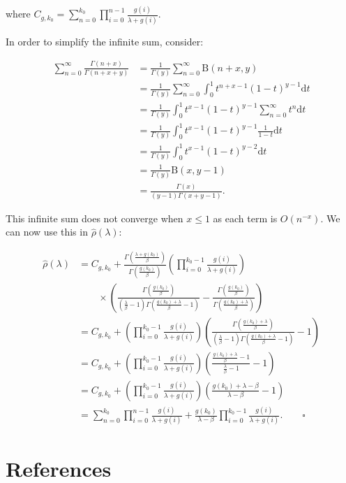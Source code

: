 \documentclass[
  sn-basic,
  10pt,
]{sn-jnl}
\theoremstyle{thmstyleone}
\theoremstyle{thmstyleone}
\theoremstyle{remark}
\theoremstyle{plain}
\theoremstyle{plain}
\theoremstyle{remark}
\begin{document}
where
\(C_{g,k_0} = \sum_{n=0}^{k_0}\prod_{i=0}^{n-1}\frac{g(i)}{\lambda+g(i)}\).

In order to simplify the infinite sum, consider:

\begin{align*}
\sum_{n=0}^\infty\frac{\Gamma(n+x)}{\Gamma(n+x+y)} &=\frac{1}{\Gamma(y)}\sum_{n=0}^\infty \text{B}(n+x,y)\\
&=\frac{1}{\Gamma(y)}\sum_{n=0}^\infty\int_0^1t^{n+x-1}(1-t)^{y-1}\text{d}t\\
&=\frac{1}{\Gamma(y)}\int_0^1 t^{x-1}(1-t)^{y-1}\sum_{n=0}^\infty t^n \text{d}t\\
&=\frac{1}{\Gamma(y)}\int_0^1 t^{x-1}(1-t)^{y-1}\frac{1}{1-t}\text{d}t\\
&=\frac{1}{\Gamma(y)}\int_0^1 t^{x-1}(1-t)^{y-2}\text{d}t\\
&=\frac{1}{\Gamma(y)}\text{B}(x,y-1)\\
&= \frac{\Gamma(x)}{(y-1)\Gamma(x+y-1)}.
\end{align*}

This infinite sum does not converge when \(x\le1\) as each term is
\(O(n^{-x})\). We can now use this in \(\hat\rho(\lambda)\):

\begin{align*}
\hat\rho(\lambda) &= C_{g,k_0} + \frac{\Gamma\left(\frac{\lambda+g(k_0)}{\beta}\right)}{\Gamma\left(\frac{g(k_0)}{\beta}\right)}\left(\prod_{i=0}^{k_0-1}\frac{g(i)}{\lambda+g(i)}\right)\\&\qquad \times\left(\frac{\Gamma\left(\frac{g(k_0)}{\beta}\right)}{\left(\frac{\lambda}{\beta}-1\right)\Gamma\left(\frac{g(k_0)+\lambda}{\beta}-1\right)}-\frac{\Gamma\left(\frac{g(k_0)}{\beta}\right)}{\Gamma\left(\frac{g(k_0)+\lambda}{\beta}\right)}\right)\\
&=C_{g,k_0} + \left(\prod_{i=0}^{k_0-1}\frac{g(i)}{\lambda+g(i)}\right)\left(\frac{\Gamma\left(\frac{g(k_0)+\lambda}{\beta}\right)}{\left(\frac{\lambda}{\beta}-1\right)\Gamma\left(\frac{g(k_0)+\lambda}{\beta}-1\right)}-1\right)\\
&=C_{g,k_0} + \left(\prod_{i=0}^{k_0-1}\frac{g(i)}{\lambda+g(i)}\right)\left(\frac{\frac{g(k_0)+\lambda}{\beta}-1}{\frac{\lambda}{\beta}-1}-1\right)\\
&=C_{g,k_0} + \left(\prod_{i=0}^{k_0-1}\frac{g(i)}{\lambda+g(i)}\right)\left(\frac{g(k_0)+\lambda-\beta}{\lambda-\beta}-1\right)\\&=\sum_{n=0}^{k_0}\prod_{i=0}^{n-1}\frac{g(i)}{\lambda+g(i)} + \frac{g(k_0)}{\lambda-\beta}\prod_{i=0}^{k_0-1}\frac{g(i)}{\lambda+g(i)}.\qquad  \square
\end{align*}

\newpage

\section*{References}\label{references}

\renewcommand{\bibsection}{}

\end{document}

